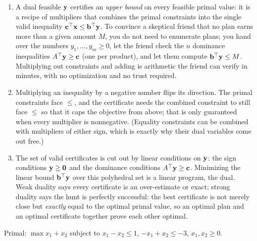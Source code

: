 
\begin{enumerate}
\item A dual feasible $\mathbf{y}$ certifies an \emph{upper bound} on every feasible primal value: it is a recipe of multipliers that combines the primal constraints into the single valid inequality $\mathbf{c}^\top\mathbf{x} \le \mathbf{b}^\top\mathbf{y}$. To convince a skeptical friend that no plan earns more than a given amount $M$, you do not need to enumerate plans; you hand over the numbers $y_1, \dots, y_m \ge 0$, let the friend check the $n$ dominance inequalities $A^\top\mathbf{y} \ge \mathbf{c}$ (one per product), and let them compute $\mathbf{b}^\top\mathbf{y} \le M$. Multiplying out constraints and adding is arithmetic the friend can verify in minutes, with no optimization and no trust required.
\item Multiplying an inequality by a negative number flips its direction. The primal constraints face $\leq$, and the certificate needs the combined constraint to still face $\leq$ so that it caps the objective from above; that is only guaranteed when every multiplier is nonnegative. (Equality constraints can be combined with multipliers of either sign, which is exactly why their dual variables come out free.)
\item The set of valid certificates is cut out by linear conditions on $\mathbf{y}$: the sign conditions $\mathbf{y} \ge \mathbf{0}$ and the dominance conditions $A^\top\mathbf{y} \ge \mathbf{c}$. Minimizing the linear bound $\mathbf{b}^\top\mathbf{y}$ over this polyhedral set is a linear program, the dual. Weak duality says every certificate is an over-estimate or exact; strong duality says the hunt is perfectly successful: the best certificate is not merely close but \emph{exactly} equal to the optimal primal value, so an optimal plan and an optimal certificate together prove each other optimal.
\end{enumerate}


Primal: $\max x_1 + x_2$ subject to $x_1 - x_2 \le 1$, $-x_1 + x_2 \le -3$, $x_1, x_2 \ge 0$.

